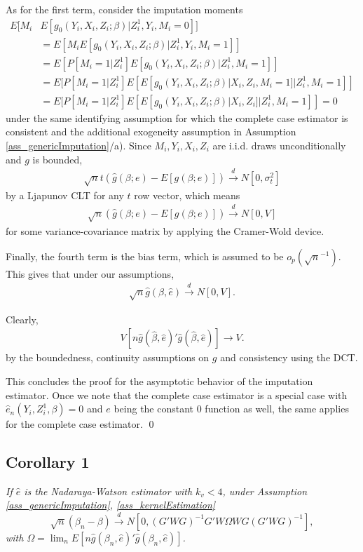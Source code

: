 \documentclass{article}
\theoremstyle{definition}
\theoremstyle{remark}
\begin{document}
As for the first term, consider the imputation moments
\begin{align}
E[M_i &E[g_0(Y_i, X_i, Z_i; \beta)|Z^1_i, Y_i, M_i=0]] \\
&=E[M_i E[g_0(Y_i, X_i, Z_i; \beta)|Z^1_i,Y_i, M_i=1]] \nonumber \\
 &=E[P[M_i=1|Z_i^1]E[g_0(Y_i, X_i, Z_i; \beta)|Z_i^1, M_i=1]] \nonumber \\
 &=E[P[M_i=1|Z_i^1]E[E[g_0(Y_i, X_i, Z_i; \beta)|X_i, Z_i, M_i=1]|Z_i^1, M_i=1]] \nonumber \\
 & =E[P[M_i=1|Z_i^1]E[E[g_0(Y_i, X_i, Z_i; \beta)|X_i, Z_i]|Z_i^1, M_i=1]]=0 \nonumber
\end{align}
under the same identifying assumption for which the complete case estimator is consistent and the additional exogeneity assumption in Assumption \ref{ass_genericImputation}/a). Since $M_i, Y_i, X_i,Z_i$ are i.i.d. draws unconditionally and $g$ is bounded,
\begin{align}
\sqrt{n}t\left(\hat{g}(\beta; e) - E[g(\beta;e)]\right) \stackrel{d}{\rightarrow}N[0,\sigma^2_t]
\end{align}
by a Ljapunov CLT for any $t$ row vector, which means
\begin{align}
\sqrt{n}\left(\hat{g}(\beta; e) - E[g(\beta;e)]\right) \stackrel{d}{\rightarrow}N[0,V]
\end{align}
for some variance-covariance matrix by applying the Cramer-Wold device.

Finally, the fourth term is the bias term, which is assumed to be $o_p\left(\sqrt{n}^{-1}\right)$. This gives that under our assumptions,
\begin{align}
\sqrt{n}\hat{g}(\beta, \hat{e}) \stackrel{d}{\rightarrow} N[0, V].
\end{align}

Clearly,
\begin{align}
V[n\hat{g}(\hat{\beta}, \hat{e})'\hat{g}(\hat{\beta}, \hat{e})]\rightarrow V.
\end{align}
by the boundedness, continuity assumptions on $g$ and consistency using the DCT.

This concludes the proof for the asymptotic behavior of the imputation estimator. Once we note that the complete case estimator is a special case with $\hat{e}_n(Y_i,Z_i^1,\beta)=0$ and $e$ being the constant 0 function as well, the same applies for the complete case estimator.
\qed

\subsection{Corollary 1}
\textit{If $\hat{e}$ is the Nadaraya-Watson estimator with $k_v<4$, under Assumption \ref{ass_genericImputation}, \ref{ass_kernelEstimation}
\[\sqrt{n}(\beta_n-\beta) \stackrel{d}{\rightarrow} N[0, (G'WG)^{-1}G'W \Omega W G (G'WG)^{-1}],
\]
with $\Omega= \lim_n E[n\hat{g}(\beta_n, \hat{e})'\hat{g}(\beta_n, \hat{e})]$. }
\end{document}
